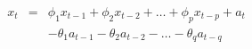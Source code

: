 

\begin{eqnarray*}
x_{t} & = & \phi_{1}x_{t-1} + \phi_{2}x_{t-2} + \ldots + \phi_{p}x_{t-p} + a_{t}\\ 
    &   & - \theta_{1}a_{t-1} - \theta_{2}a_{t-2} - \ldots - \theta_{q}a_{t-q}
\end{eqnarray*}


